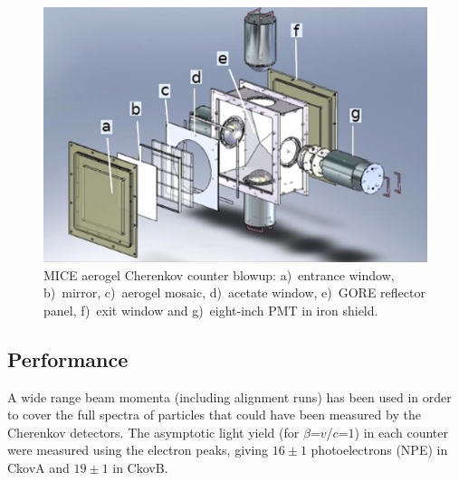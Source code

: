 \begin{figure}[htb!]
  \begin{center}
    \includegraphics[width=0.6\columnwidth]{./03-Ckov/Figures/Ckov_fix.png}
    \caption{MICE aerogel Cherenkov counter blowup: a)~entrance window, b)~mirror, c)~aerogel mosaic, d)~acetate window, e)~GORE reflector panel, f)~exit window and g)~eight-inch PMT in iron shield.}
    \label{fig:ckov1}
  \end{center}
\end{figure}

\subsection{Performance}
\label{SubSect:Ckov_Performance}

A wide range beam momenta (including alignment runs) has been used in order to cover the full spectra of particles that could have been measured by the Cherenkov detectors.
The asymptotic light yield (for $\beta$=$v$/$c$=$1$) in each counter were measured using the electron peaks, giving $16\pm1$ photoelectrons (NPE) in CkovA and $19\pm1$ in CkovB.


